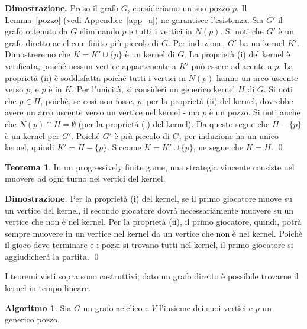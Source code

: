 \documentclass[a4paper, 10pt]{report}
\newenvironment{dimostrazione}{\textbf{Dimostrazione.} }{ \qed}
\theoremstyle{definition} %
\newtheorem{theorem}{Teorema}
\newtheorem{algorithm}{Algoritmo}
\begin{document}
\begin{dimostrazione}
Preso il grafo $G$, consideriamo un suo pozzo $p$. Il Lemma~\ref{pozzo} (vedi
Appendice~\ref{app_a}) ne garantisce l'esistenza. 
Sia $G'$ il grafo ottenuto da $G$ eliminando $p$ e tutti i vertici in
$N(p)$. Si  noti che $G'$ \`e un grafo diretto aciclico e finito pi\`u piccolo
di $G$.  Per induzione, $G'$ ha un kernel $K'$. Dimostreremo che $K = K' \cup
\{p\}$ \`e un kernel di $G$. La propriet\`a (i) del kernel \`e verificata,
poich\'e nessun vertice appartenente a $K'$ pu\`o essere adiacente a $p$.
La propriet\`a (ii) \`e soddisfatta poich\'e tutti i vertici in $N(p)$ hanno
un arco uscente verso $p$, e $p$ \`e in $K$.
Per l'unicit\`a, si consideri un generico kernel $H$ di $G$. Si noti che $p
\in H$, poich\`e, se cos\`i non fosse, $p$, per la propriet\`a (ii) del
kernel, dovrebbe avere un arco uscente verso un vertice nel kernel - ma $p$
\`e un pozzo. Si noti anche che $N(p) \cap H = \emptyset$ (per la propriet\'a
(i) del kernel). Da questo segue che $H - \{p\}$ \`e un kernel per $G'$.
Poich\'e $G'$ \`e pi\`u piccolo di $G$, per induzione ha un unico kernel,
quindi $K' = H -\{p\}$. Siccome $K = K' \cup \{p\}$, ne segue che $K = H$.
\end{dimostrazione}
\newline

\begin{theorem}
In un progressively finite game, una strategia vincente consiste nel muovere ad
ogni turno nei vertici del kernel.
\end{theorem}

\begin{dimostrazione}
Per la propriet\`a (i) del kernel, se il primo giocatore muove su un vertice 
del kernel, il secondo giocatore dovr\`a necessariamente muovere su un vertice 
che non \`e nel kernel. Per la propriet\`a (ii), il primo giocatore, quindi, 
potr\`a sempre muovere in un vertice nel kernel da un vertice che non \`e nel 
kernel. Poich\`e il gioco deve terminare e i pozzi si trovano tutti 
nel kernel, il primo giocatore si aggiudicher\'a la partita.
\end{dimostrazione}
\newline

I teoremi visti sopra sono costruttivi; dato un grafo diretto \`e possibile
trovarne il kernel in tempo lineare.

\newpage

\begin{algorithm} \label{findkernel}
Sia $G$ un grafo aciclico e $V$ l'insieme dei suoi vertici e $p$ un generico
pozzo.
\end{algorithm}
\end{document}
